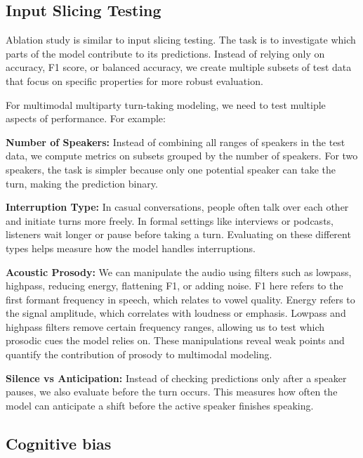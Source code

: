 \documentclass[11pt]{article}
\begin{document}
\subsection{Input Slicing Testing}
Ablation study is similar to input slicing testing. The task is to investigate which parts of the model contribute to its predictions. Instead of relying only on accuracy, F1 score, or balanced accuracy, we create multiple subsets of test data that focus on specific properties for more robust evaluation.

For multimodal multiparty turn-taking modeling, we need to test multiple aspects of performance. For example:

\textbf{Number of Speakers:} Instead of combining all ranges of speakers in the test data, we compute metrics on subsets grouped by the number of speakers. For two speakers, the task is simpler because only one potential speaker can take the turn, making the prediction binary.

\textbf{Interruption Type:} In casual conversations, people often talk over each other and initiate turns more freely. In formal settings like interviews or podcasts, listeners wait longer or pause before taking a turn. Evaluating on these different types helps measure how the model handles interruptions.

\textbf{Acoustic Prosody:} We can manipulate the audio using filters such as lowpass, highpass, reducing energy, flattening F1, or adding noise. F1 here refers to the first formant frequency in speech, which relates to vowel quality. Energy refers to the signal amplitude, which correlates with loudness or emphasis. Lowpass and highpass filters remove certain frequency ranges, allowing us to test which prosodic cues the model relies on. These manipulations reveal weak points and quantify the contribution of prosody to multimodal modeling.

\textbf{Silence vs Anticipation:} Instead of checking predictions only after a speaker pauses, we also evaluate before the turn occurs. This measures how often the model can anticipate a shift before the active speaker finishes speaking.

 \subsection{Cognitive bias}
\end{document}
